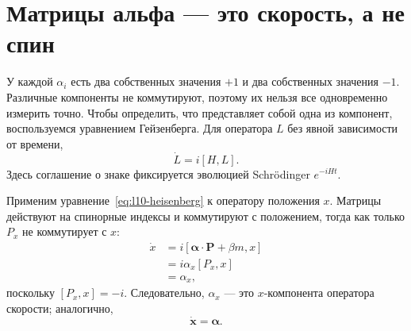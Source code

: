 \begin{classroomqa}
\end{classroomqa}

\section{Матрицы альфа — это скорость, а не спин}

У каждой \(\alpha_i\) есть два собственных значения \(+1\) и два собственных значения \(-1\). Различные компоненты не коммутируют, поэтому их нельзя все одновременно измерить точно. Чтобы определить, что представляет собой одна из компонент, воспользуемся уравнением Гейзенберга. Для оператора \(L\) без явной зависимости от времени,
\begin{equation}
\dot L=i[H,L].
\label{eq:l10-heisenberg}
\end{equation}
Здесь соглашение о знаке фиксируется эволюцией Schr\"odinger \(e^{-iHt}\).

Применим уравнение~\eqref{eq:l10-heisenberg} к оператору положения \(x\). Матрицы действуют на спинорные индексы и коммутируют с положением, тогда как только \(P_x\) не коммутирует с \(x\):
\begin{align}
\dot x
&=i[\boldsymbol{\alpha}\cdot\mathbf P+\beta m,x]\\
&=i\alpha_x[P_x,x]\\
&=\alpha_x,
\label{eq:l10-velocity}
\end{align}
поскольку \([P_x,x]=-i\). Следовательно, \(\alpha_x\) — это \(x\)-компонента оператора скорости; аналогично,
\begin{equation}
\dot{\mathbf x}=\boldsymbol{\alpha}.
\end{equation}

\begin{classroomqa}
\end{classroomqa}

